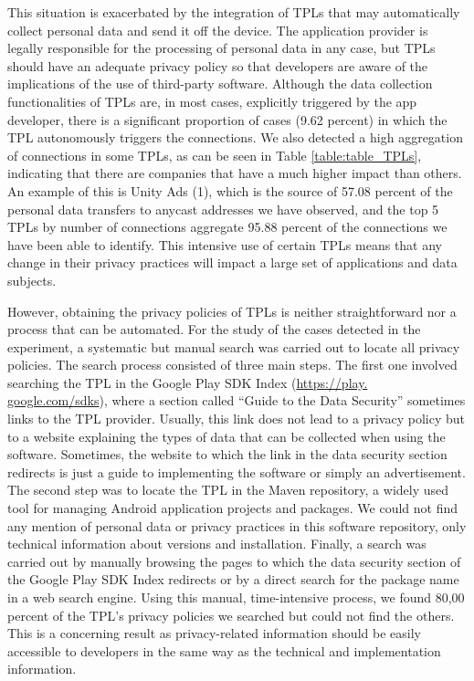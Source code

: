 \documentclass{article}
\begin{document}
This situation is exacerbated by the integration of TPLs that may automatically collect personal data and send it off the device. The application provider is legally responsible for the processing of personal data in any case, but TPLs should have an adequate privacy policy so that developers are aware of the implications of the use of third-party software. Although the data collection functionalities of TPLs are, in most cases, explicitly triggered by the app developer, there is a significant proportion of cases (9.62 percent) in which the TPL autonomously triggers the connections. We also detected a high aggregation of connections in some TPLs, as can be seen in Table \ref{table:table_TPLs}, indicating that there are companies that have a much higher impact than others. An example of this is Unity Ads (1), which is the source of 57.08 percent of the personal data transfers to anycast addresses we have observed, and the top 5 TPLs by number of connections aggregate 95.88 percent of the connections we have been able to identify. This intensive use of certain TPLs means that any change in their privacy practices will impact a large set of applications and data subjects.

However, obtaining the privacy policies of TPLs is neither straightforward nor a process that can be automated. For the study of the cases detected in the experiment, a systematic but manual search was carried out to locate all privacy policies. The search process consisted of three main steps. The first one involved searching the TPL in the Google Play SDK Index (\url{https://play. google.com/sdks}), where a section called “Guide to the Data Security” sometimes links to the TPL provider. Usually, this link does not lead to a privacy policy but to a website explaining the types of data that can be collected when using the software. Sometimes, the website to which the link in the data security section redirects is just a guide to implementing the software or simply an advertisement. The second step was to locate the TPL in the Maven repository, a widely used tool for managing Android application projects and packages. We could not find any mention of personal data or privacy practices in this software repository, only technical information about versions and installation. Finally, a search was carried out by manually browsing the pages to which the data security section of the Google Play SDK Index redirects or by a direct search for the package name in a web search engine. Using this manual, time-intensive process, we found 80,00 percent of the TPL's privacy policies we searched but could not find the others. This is a concerning result as privacy-related information should be easily accessible to developers in the same way as the technical and implementation information.
\end{document}
